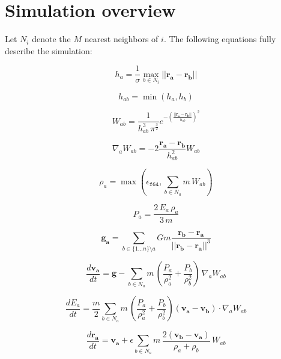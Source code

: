 \documentclass[../main.tex]{subfiles}
\begin{document}
\section{Simulation overview}

Let $N_i$ denote the $M$ nearest neighbors of $i$. The following equations fully describe the
simulation:
\begin{multicols}{2}

\begin{equation}
    h_a = \frac{1}{\sigma} \max_{b \in N_i} ||\bm{r_a} - \bm{r_b}||
\end{equation}

\begin{equation}
    h_{ab} = \min(h_a, h_b)
\end{equation}

\begin{equation}
    W_{ab} = \frac{1}{h_{ab}^3 \, \pi^{\frac{3}{2}}} e^{-(\frac{||\bm{r_a} - \bm{r_b}||}{h_{ab}})^2}
\end{equation}

\begin{equation}
    \nabla_a W_{ab} = -2 \frac{\bm{r_a} - \bm{r_b}}{h_{ab}^2} W_{ab}
\end{equation}

\begin{equation}
    \rho_a = \max \left( \mathtt{\epsilon_{f64}}, \sum_{b \in N_a} m \, W_{ab} \right)
\end{equation}

\begin{equation}
    P_a = \frac{2 \, E_a \, \rho_a}{3 \, m}
\end{equation}

\begin{equation}
    \bm{g_a} = \sum_{b \in \{1 \dots n\} \setminus a} G m \frac{\bm{r_b} - \bm{r_a}}{||\bm{r_b} - \bm{r_a}||^3}
\end{equation}

\begin{equation}
    \frac{d\bm{v_a}}{dt}
    = \bm{g} - \sum_{b \in N_a} m \, (\frac{P_a}{\rho_a^2} + \frac{P_b}{\rho_b^2}) \, \nabla_a W_{ab}
\end{equation}

\begin{equation}
    \frac{dE_a}{dt}
    = \frac{m}{2} \sum_{b \in N_a} m \, (\frac{P_a}{\rho_a^2} + \frac{P_b}{\rho_b^2}) (\bm{v_a} - \bm{v_b})
    \cdot \nabla_a W_{ab}
\end{equation}

\begin{equation}
    \frac{d\bm{r_a}}{dt}
    = \bm{v_a} + \epsilon \sum_{b \in N_a} m \, \frac{2 (\bm{v_b} - \bm{v_a})}{\rho_a + \rho_b} \, W_{ab}
\end{equation}

\end{multicols}
\end{document}
